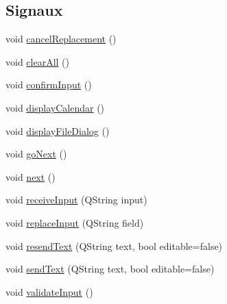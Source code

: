 \subsection*{Signaux}
\begin{DoxyCompactItemize}
\item 
void \hyperlink{classSH__InOutStateMachine_a035d37535533d4805fe2606f38c19380}{cancel\-Replacement} ()
\item 
void \hyperlink{classSH__InOutStateMachine_aa1d5860888c96ff94c55dc77e0fdfdcf}{clear\-All} ()
\item 
void \hyperlink{classSH__InOutStateMachine_a7f7d9c9300c1d05bce2c26029f28cc31}{confirm\-Input} ()
\item 
void \hyperlink{classSH__InOutStateMachine_ab3a12d1f9b658d8ffdc17669a6c065f2}{display\-Calendar} ()
\item 
void \hyperlink{classSH__InOutStateMachine_abd206c3bc32bb7690df9c3e1cd546ebc}{display\-File\-Dialog} ()
\item 
void \hyperlink{classSH__GenericStateMachine_aec37e33524182ab83bf300f1cc1a064e}{go\-Next} ()
\item 
void \hyperlink{classSH__GenericStateMachine_af4771d31d87951c997fba1633c2d67f6}{next} ()
\item 
void \hyperlink{classSH__InOutStateMachine_a037ed5e13ecfae2123a8d4940292e410}{receive\-Input} (Q\-String input)
\item 
void \hyperlink{classSH__InOutStateMachine_a9fa5db44086de2576c812f631aa4f60a}{replace\-Input} (Q\-String field)
\item 
void \hyperlink{classSH__InOutStateMachine_a526822c66b46aa0cd81ba4473fa5573f}{resend\-Text} (Q\-String text, bool editable=false)
\item 
void \hyperlink{classSH__InOutStateMachine_a5e7f5958bae31696b6a8deab94ad2b4f}{send\-Text} (Q\-String text, bool editable=false)
\item 
void \hyperlink{classSH__InOutStateMachine_aec1b3fef3c1f82499aa1f73beaecd08a}{validate\-Input} ()
\end{DoxyCompactItemize}

